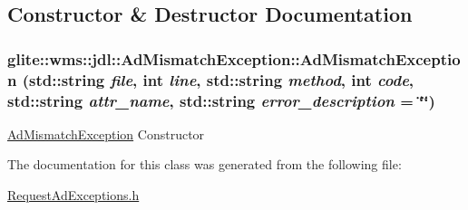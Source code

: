 \subsection{Constructor \& Destructor Documentation}
\hypertarget{classglite_1_1wms_1_1jdl_1_1AdMismatchException_a0}{
\subsubsection[AdMismatchException]{\setlength{\rightskip}{0pt plus 5cm}glite::wms::jdl::Ad\-Mismatch\-Exception::Ad\-Mismatch\-Exception (std::string {\em file}, int {\em line}, std::string {\em method}, int {\em code}, std::string {\em attr\_\-name}, std::string {\em error\_\-description} = \char`\"{}\char`\"{})}}
\label{classglite_1_1wms_1_1jdl_1_1AdMismatchException_a0}


\hyperlink{classglite_1_1wms_1_1jdl_1_1AdMismatchException}{Ad\-Mismatch\-Exception} Constructor 

The documentation for this class was generated from the following file:\begin{CompactItemize}
\item 
\hyperlink{RequestAdExceptions_8h}{Request\-Ad\-Exceptions.h}\end{CompactItemize}
